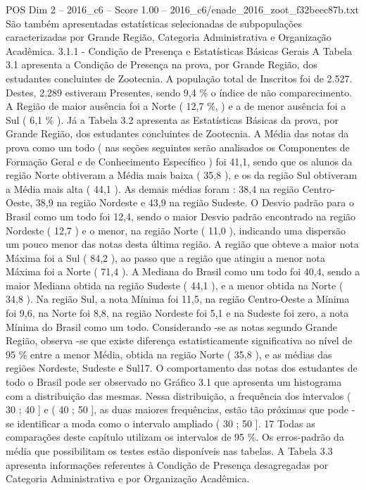 \begin{textsample}{POS Dim 2 – 2016\_c6 – Score 1.00 – 2016\_c6/enade\_2016\_zoot\_f32beec87b.txt}
São também apresentadas estatísticas selecionadas de subpopulações caracterizadas por Grande Região, Categoria Administrativa e Organização Acadêmica. 3.1.1 - Condição de Presença e Estatísticas Básicas Gerais A Tabela 3.1 apresenta a Condição de Presença na prova, por Grande Região, dos estudantes concluintes de Zootecnia.
A população total de Inscritos foi de 2.527.
Destes, 2.289 estiveram Presentes, sendo 9,4 \% o índice de não comparecimento.
A Região de maior ausência foi a Norte ( 12,7 \%, ) e a de menor ausência foi a Sul ( 6,1 \% ).
Já a Tabela 3.2 apresenta as Estatísticas Básicas da prova, por Grande Região, dos estudantes concluintes de Zootecnia.
A Média das notas da prova como um todo ( nas seções seguintes serão analisados os Componentes de Formação Geral e de Conhecimento Específico ) foi 41,1, sendo que os alunos da região Norte obtiveram a Média mais baixa ( 35,8 ), e os da região Sul obtiveram a Média mais alta ( 44,1 ).
As demais médias foram : 38,4 na região Centro-Oeste, 38,9 na região Nordeste e 43,9 na região Sudeste.
O Desvio padrão para o Brasil como um todo foi 12,4, sendo o maior Desvio padrão encontrado na região Nordeste ( 12,7 ) e o menor, na região Norte ( 11,0 ), indicando uma dispersão um pouco menor das notas desta última região.
A região que obteve a maior nota Máxima foi a Sul ( 84,2 ), ao passo que a região que atingiu a menor nota Máxima foi a Norte ( 71,4 ).
A Mediana do Brasil como um todo foi 40,4, sendo a maior Mediana obtida na região Sudeste ( 44,1 ), e a menor obtida na Norte ( 34,8 ).
Na região Sul, a nota Mínima foi 11,5, na região Centro-Oeste a Mínima foi 9,6, na Norte foi 8,8, na região Nordeste foi 5,1 e na Sudeste foi zero, a nota Mínima do Brasil como um todo.
Considerando -se as notas segundo Grande Região, observa -se que existe diferença estatisticamente significativa ao nível de 95 \% entre a menor Média, obtida na região Norte ( 35,8 ), e as médias das regiões Nordeste, Sudeste e Sul17.
O comportamento das notas dos estudantes de todo o Brasil pode ser observado no Gráfico 3.1 que apresenta um histograma com a distribuição das mesmas.
Nessa distribuição, a frequência dos intervalos ( 30 ; 40 ] e ( 40 ; 50 ], as duas maiores frequências, estão tão próximas que pode -se identificar a moda como o intervalo ampliado ( 30 ; 50 ]. 17 Todas as comparações deste capítulo utilizam os intervalos de 95 \%.
Os erros-padrão da média que possibilitam os testes estão disponíveis nas tabelas.
A Tabela 3.3 apresenta informações referentes à Condição de Presença desagregadas por Categoria Administrativa e por Organização Acadêmica.

\end{textsample}
